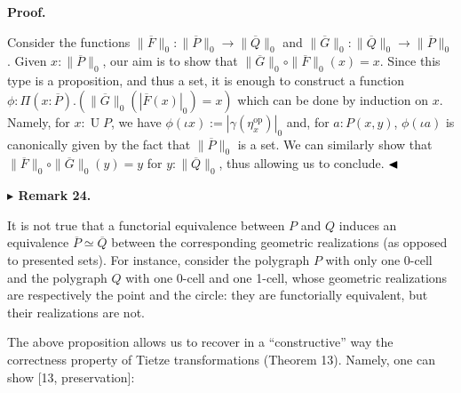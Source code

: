 \documentclass[10pt,a4paper]{amsart}
\begin{document}
\par\medskip\noindent\textbf{Proof.}\par
 
 
Consider the functions $\|\overline{F}\|_{0}:\|\overline{P}\|_{0}\to\|\overline{Q}\|_{0}$ and $\|\overline{G}\|_{0}:\|\overline{Q}\|_{0}\to\|\overline{P}\|_{0}$. Given $x:\|\overline{P}\|_{0}$, our aim is to show that $\|\overline{G}\|_{0}\circ\|\overline{F}\|_{0}(x)=x$. Since this type is a proposition, and thus a set, it is enough to construct a function $\phi:\Pi(x:\overline{P}).(\|\overline{G}\|_{0}(|\overline{F}(x)|_{0})=x)$ which can be done by induction on $x$. Namely, for $x:\operatorname{U}P$, we have $\phi(\iota x):=|\gamma(\eta_{x}^{\mathrm{op}})|_{0}$ and, for $a:P(x,y)$, $\phi(\iota a)$ is canonically given by the fact that $\|\overline{P}\|_{0}$ is a set. We can similarly show that $\|\overline{F}\|_{0}\circ\|\overline{G}\|_{0}(y)=y$ for $y:\|\overline{Q}\|_{0}$, thus allowing us to conclude. $\hfill\blacktriangleleft$\par
 
 
 
\par\medskip\noindent\textbf{$\blacktriangleright$ Remark 24.}\par
 
 
It is not true that a functorial equivalence between $P$ and $Q$ induces an equivalence $\overline{P}\simeq\overline{Q}$ between the corresponding geometric realizations (as opposed to presented sets). For instance, consider the polygraph $P$ with only one 0-cell and the polygraph $Q$ with one 0-cell and one 1-cell, whose geometric realizations are respectively the point and the circle: they are functorially equivalent, but their realizations are not.\par
 
 
 
 
The above proposition allows us to recover in a “constructive” way the correctness property of Tietze transformations (Theorem 13). Namely, one can show [13, preservation]:\par
 
 
\end{document}
